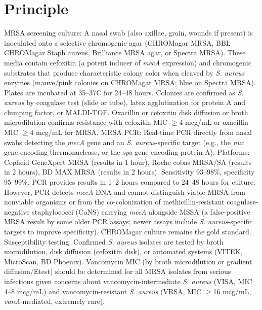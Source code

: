 \section*{Principle}
MRSA screening culture: A nasal swab (also axillae, groin, wounds if present) is inoculated onto a selective chromogenic agar (CHROMagar MRSA, BBL CHROMagar Staph aureus, Brilliance MRSA agar, or Spectra MRSA). These media contain cefoxitin (a potent inducer of \textit{mecA} expression) and chromogenic substrates that produce characteristic colony color when cleaved by \textit{S. aureus} enzymes (mauve/pink colonies on CHROMagar MRSA; blue on Spectra MRSA). Plates are incubated at 35--37\textdegree{}C for 24--48 hours. Colonies are confirmed as \textit{S. aureus} by coagulase test (slide or tube), latex agglutination for protein A and clumping factor, or MALDI-TOF. Oxacillin or cefoxitin disk diffusion or broth microdilution confirms resistance with cefoxitin MIC $\geq$4 mcg/mL or oxacillin MIC $\geq$4 mcg/mL for MRSA. MRSA PCR: Real-time PCR directly from nasal swabs detecting the \textit{mecA} gene and an \textit{S. aureus}-specific target (e.g., the \textit{nuc} gene encoding thermonuclease, or the \textit{spa} gene encoding protein A). Platforms: Cepheid GeneXpert MRSA (results in 1 hour), Roche cobas MRSA/SA (results in 2 hours), BD MAX MRSA (results in 2 hours). Sensitivity 93--98\%, specificity 95--99\%. PCR provides results in 1--2 hours compared to 24--48 hours for culture. However, PCR detects \textit{mecA} DNA and cannot distinguish viable MRSA from nonviable organisms or from the co-colonization of methicillin-resistant coagulase-negative staphylococci (CoNS) carrying \textit{mecA} alongside MSSA (a false-positive MRSA result by some older PCR assays; newer assays include \textit{S. aureus}-specific targets to improve specificity). CHROMagar culture remains the gold standard. Susceptibility testing: Confirmed \textit{S. aureus} isolates are tested by broth microdilution, disk diffusion (cefoxitin disk), or automated systems (VITEK, MicroScan, BD Phoenix). Vancomycin MIC (by broth microdilution or gradient diffusion/Etest) should be determined for all MRSA isolates from serious infections given concerns about vancomycin-intermediate \textit{S. aureus} (VISA, MIC 4--8 mcg/mL) and vancomycin-resistant \textit{S. aureus} (VRSA, MIC $\geq$16 mcg/mL, \textit{vanA}-mediated, extremely rare).

